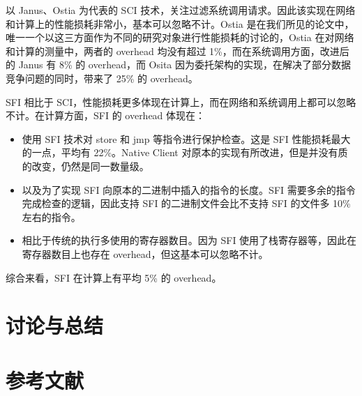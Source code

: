 \documentclass[final,12pt]{elsarticle}
\begin{document}
以 Janus、Ostia 为代表的 SCI 技术，关注过滤系统调用请求。因此该实现在网络和计算上的性能损耗非常小，基本可以忽略不计。Ostia 是在我们所见的论文中，唯一一个以这三方面作为不同的研究对象进行性能损耗的讨论的，Ostia 在对网络和计算的测量中，两者的 overhead 均没有超过 1\%，而在系统调用方面，改进后的 Janus \cite{wagner1999janus} 有 8\% 的 overhead，而 Osita 因为委托架构的实现，在解决了部分数据竞争问题的同时，带来了 25\% 的 overhead。

SFI 相比于 SCI，性能损耗更多体现在计算上，而在网络和系统调用上都可以忽略不计。在计算方面，SFI 的 overhead 体现在：

\begin{itemize}
\item
使用 SFI 技术对 store 和 jmp 等指令进行保护检查。这是 SFI 性能损耗最大的一点，平均有 22\%。Native Client 对原本的实现有所改进，但是并没有质的改变，仍然是同一数量级。
\item
以及为了实现 SFI 向原本的二进制中插入的指令的长度。SFI 需要多余的指令完成检查的逻辑，因此支持 SFI 的二进制文件会比不支持 SFI 的文件多 10\% 左右的指令。
\item
相比于传统的执行多使用的寄存器数目。因为 SFI 使用了栈寄存器等，因此在寄存器数目上也存在 overhead，但这基本可以忽略不计。
\end{itemize}

综合来看，SFI 在计算上有平均 5\% 的 overhead。


\section{讨论与总结}
\label{s:tucao}


\clearpage

\section*{参考文献}





 

\end{document}
